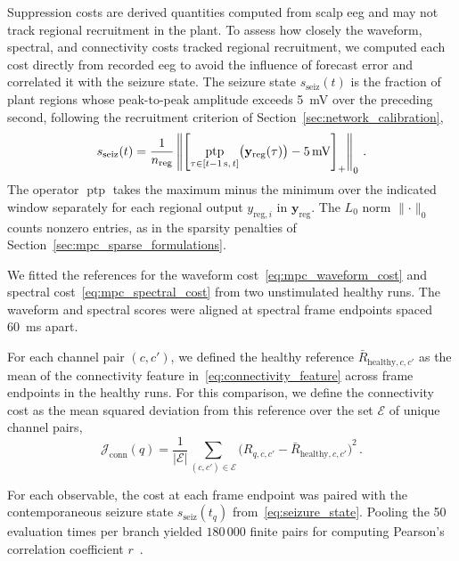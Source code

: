 Suppression costs are derived quantities computed from scalp \ac{eeg} and may not track regional recruitment in the plant.
To assess how closely the waveform, spectral, and connectivity costs tracked regional recruitment, we computed each cost directly from recorded \ac{eeg} to avoid the influence of forecast error and correlated it with the seizure state.
The seizure state \(s_{\mathrm{seiz}}(t)\) is the fraction of plant regions whose peak-to-peak amplitude exceeds \SI{5}{\milli\volt} over the preceding second, following the recruitment criterion of Section~\ref{sec:network_calibration},
\begin{equation}
  s_{\mathrm{seiz}}(t) = \frac{1}{n_{\mathrm{reg}}}
  \left\|
    {\left[
      \underset{\tau\in[t-\SI{1}{\second},\,t]}{\operatorname{ptp}}
      \bigl(\mathbf y_{\mathrm{reg}}(\tau)\bigr) - \SI{5}{\milli\volt}
    \right]}_+
  \right\|_0\,.
  \label{eq:seizure_state}
\end{equation}
The operator \(\operatorname{ptp}\) takes the maximum minus the minimum over the indicated window separately for each regional output \(y_{\mathrm{reg},i}\) in \(\mathbf y_{\mathrm{reg}}\).
The \(L_0\) norm \(\lVert\cdot\rVert_0\) counts nonzero entries, as in the sparsity penalties of Section~\ref{sec:mpc_sparse_formulations}.

We fitted the references for the waveform cost~\eqref{eq:mpc_waveform_cost} and spectral cost~\eqref{eq:mpc_spectral_cost} from two unstimulated healthy runs.
The waveform and spectral scores were aligned at spectral frame endpoints spaced \SI{60}{\milli\second} apart.

For each channel pair \((c,c')\), we defined the healthy reference \(\bar R_{\mathrm{healthy},c,c'}\) as the mean of the connectivity feature in~\eqref{eq:connectivity_feature} across frame endpoints in the healthy runs.
For this comparison, we define the connectivity cost as the mean squared deviation from this reference over the set \(\mathcal E\) of unique channel pairs,
\begin{equation*}
  \mathcal J_{\mathrm{conn}}(q)
  = \frac{1}{|\mathcal E|}\sum_{(c,c')\in\mathcal E}
     {\bigl(R_{q,c,c'}-\bar R_{\mathrm{healthy},c,c'}\bigr)}^2\,.
\end{equation*}

For each observable, the cost at each frame endpoint was paired with the contemporaneous seizure state \(s_{\mathrm{seiz}}(t_q)\) from~\eqref{eq:seizure_state}.
Pooling the 50 evaluation times per branch yielded \(180\,000\) finite pairs for computing Pearson's correlation coefficient \(r\)~\cite{NIST1997Correlation}.

